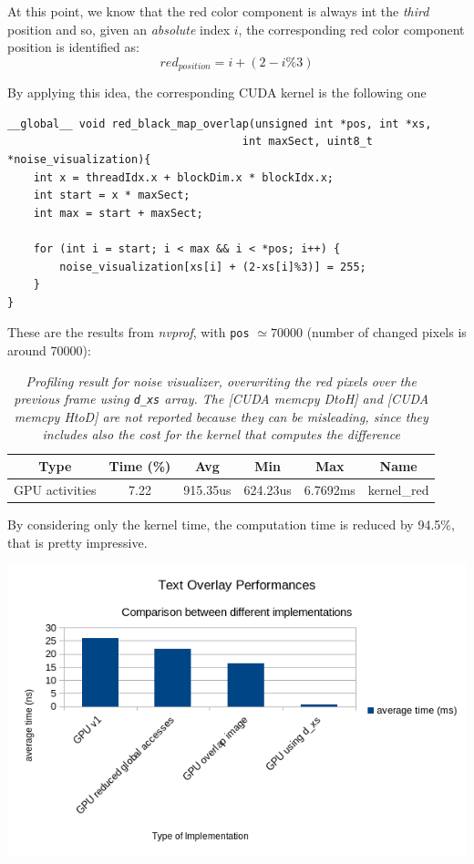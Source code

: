 \documentclass[paper=a4, fontsize=10pt]{scrartcl}	%
\begin{document}
	At this point, we know that the red color component is always int the \textit{third} position and so, given an \textit{absolute} index $i$, the corresponding red color component position is identified as:
	\[
		red_{position} = i + (2 - i\%3)
	\]
	
	By applying this idea, the corresponding CUDA kernel is the following one
	\begin{lstlisting}[style=CStyle]
__global__ void red_black_map_overlap(unsigned int *pos, int *xs,
									int maxSect, uint8_t *noise_visualization){
	int x = threadIdx.x + blockDim.x * blockIdx.x;
	int start = x * maxSect;
	int max = start + maxSect;
	
	for (int i = start; i < max && i < *pos; i++) {
		noise_visualization[xs[i] + (2-xs[i]%3)] = 255;
	}
}\end{lstlisting}

	These are the results from \textit{nvprof}, with \texttt{pos} $\simeq 70000$ (number of changed pixels is around 70000):
	\begin{table}[H]
		\centering
		\begin{center}
			\begin{tabular}{ |c|c|c|c|c|c| } 
				\hline
				\textbf{Type} & \textbf{Time} (\%) & \textbf{Avg} & \textbf{Min} & \textbf{Max} & \textbf{Name} \\ 
				\hline
				GPU activities & 7.22 & 915.35us &  624.23us &  6.7692ms & kernel\_red\\
				\hline
			\end{tabular}
		\end{center}
		\label{fig:table_v4_red}
		\caption{\textit{Profiling result for noise visualizer, overwriting the red pixels over the previous frame using \texttt{d\_xs} array. The \textit{[CUDA memcpy DtoH]} and [CUDA memcpy HtoD] are not reported because they can be misleading, since they includes also the cost for the kernel that computes the difference}}
	\end{table}
	
	By considering only the kernel time, the computation time is reduced by 94.5\%, that is pretty impressive.

	\begin{center}
		\includegraphics[width=0.6\linewidth]{images/heatmap/noise3}
	\end{center}
\end{document}
